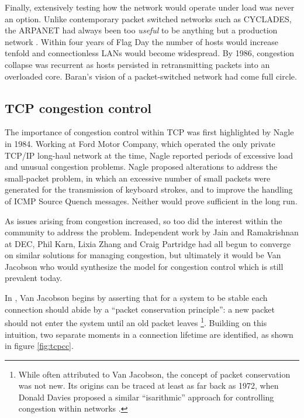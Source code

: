 Finally, extensively testing how the network would operate under load was never an option. 
Unlike contemporary packet switched networks such as CYCLADES, the \ac{ARPANET} had always been too \textit{useful} to be anything but a production network \cite{Day:2010p187}. 
Within four years of Flag Day the number of hosts would increase tenfold and connectionless \acp{LAN} would become widespread. 
By 1986, congestion collapse was recurrent as hosts persisted in retransmitting packets into an overloaded core.
Baran's vision of a packet-switched network had come full circle.

\subsection{TCP congestion control}
\label{sec:resourcepooling:tcp}

The importance of congestion control within \ac{TCP} was first highlighted by Nagle \cite{Nagle:1984p458} in 1984. 
Working at Ford Motor Company, which operated the only private \ac{TCP}/\ac{IP} long-haul network at the time, Nagle reported periods of excessive load and unusual congestion problems. 
Nagle proposed alterations to address the small-packet problem, in which an excessive number of small packets were generated for the transmission of keyboard strokes, and to improve the handling of \ac{ICMP} Source Quench messages. 
Neither would prove sufficient in the long run.  

As issues arising from congestion increased, so too did the interest within the community to address the problem. 
Independent work by Jain and Ramakrishnan at \ac{DEC}, Phil Karn, Lixia Zhang and Craig Partridge had all begun to converge on similar solutions for managing congestion, but ultimately it would be Van Jacobson who would synthesize the model for congestion control which is still prevalent today.

In \cite{Jacobson:1988p398}, Van Jacobson begins by asserting that for a system to be stable each connection should abide by a ``packet conservation principle'': a new packet should not enter the system until an old packet leaves \footnote{While often attributed to Van Jacobson, the concept of packet conservation was not new. Its origins can be traced at least as far back as 1972, when Donald Davies proposed a similar ``isarithmic'' approach for controlling congestion within networks \cite{Davies:1972p473}.}. 
Building on this intuition, two separate moments in a connection lifetime are identified, as shown in figure \ref{fig:tcpcc}. 

